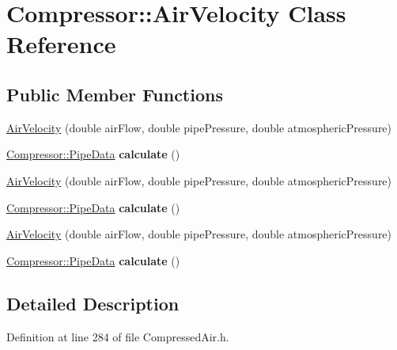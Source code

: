 \hypertarget{class_compressor_1_1_air_velocity}{}\section{Compressor\+:\+:Air\+Velocity Class Reference}
\label{class_compressor_1_1_air_velocity}
\subsection*{Public Member Functions}
\begin{DoxyCompactItemize}
\item 
\hyperlink{class_compressor_1_1_air_velocity_a53449e5354b1e33db644078ce4d92e4b}{Air\+Velocity} (double air\+Flow, double pipe\+Pressure, double atmospheric\+Pressure)
\item 
\mbox{\label{class_compressor_1_1_air_velocity_af17f62700c50a692b4a0db98a11c880c}} 
\hyperlink{struct_compressor_1_1_pipe_data}{Compressor\+::\+Pipe\+Data} {\bfseries calculate} ()
\item 
\hyperlink{class_compressor_1_1_air_velocity_a53449e5354b1e33db644078ce4d92e4b}{Air\+Velocity} (double air\+Flow, double pipe\+Pressure, double atmospheric\+Pressure)
\item 
\mbox{\label{class_compressor_1_1_air_velocity_af17f62700c50a692b4a0db98a11c880c}} 
\hyperlink{struct_compressor_1_1_pipe_data}{Compressor\+::\+Pipe\+Data} {\bfseries calculate} ()
\item 
\hyperlink{class_compressor_1_1_air_velocity_a53449e5354b1e33db644078ce4d92e4b}{Air\+Velocity} (double air\+Flow, double pipe\+Pressure, double atmospheric\+Pressure)
\item 
\mbox{\label{class_compressor_1_1_air_velocity_af17f62700c50a692b4a0db98a11c880c}} 
\hyperlink{struct_compressor_1_1_pipe_data}{Compressor\+::\+Pipe\+Data} {\bfseries calculate} ()
\end{DoxyCompactItemize}


\subsection{Detailed Description}


Definition at line 284 of file Compressed\+Air.\+h.



